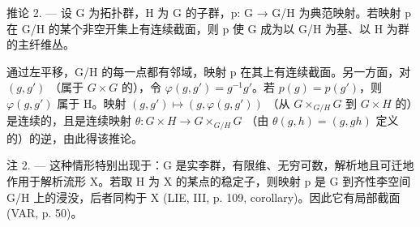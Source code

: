 推论 2. --- 设 G 为拓扑群，H 为 G 的子群，p: G → G/H 为典范映射。若映射 p 在 G/H 的某个非空开集上有连续截面，则 p 使 G 成为以 G/H 为基、以 H 为群的主纤维丛。

通过左平移，G/H 的每一点都有邻域，映射 p 在其上有连续截面。另一方面，对 \((g,g')\) （属于 \(G\times G\) 的），令 \(\varphi(g,g')=g^{-1}g'\)。若 \(p(g)=p(g')\)，则 \(\varphi(g,g')\) 属于 H。映射 \((g,g')\mapsto(g,\varphi(g,g'))\) （从 \(G\times_{G/H}G\) 到 \(G\times H\) 的）是连续的，且是连续映射 \(\theta: G\times H\to G\times_{G/H}G\) （由 \(\theta(g,h)=(g,gh)\) 定义的）的逆，由此得该推论。

注 2. --- 这种情形特别出现于：G 是实李群，有限维、无穷可数，解析地且可迁地作用于解析流形 X。若取 H 为 X 的某点的稳定子，则映射 p 是 G 到齐性李空间 G/H 上的浸没，后者同构于 X (LIE, III, p. 109, corollary)。因此它有局部截面 (VAR, p. 50)。
